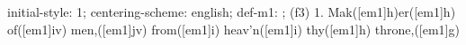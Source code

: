 initial-style: 1;
centering-scheme: english;
def-m1: \grealign;
(f3) 1. Mak([em1]h)er([em1]h) of([em1]iv) men,([em1]jv) from([em1]i) heav'n([em1]i) thy([em1]h) throne,([em1]g)